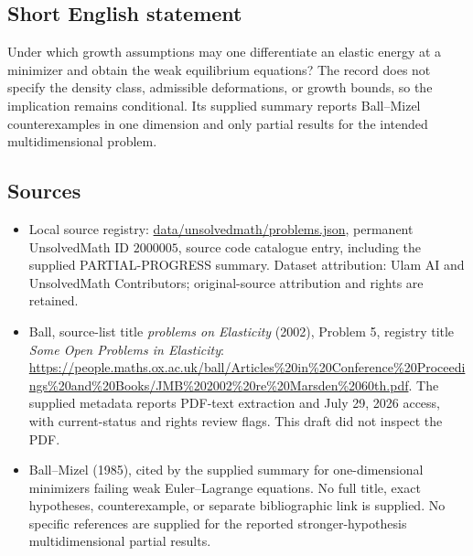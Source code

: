 \documentclass[11pt]{article}
\begin{document}
\subsection{Short English statement}
Under which growth assumptions may one differentiate an elastic energy at a minimizer and obtain the weak equilibrium equations? The record does not specify the density class, admissible deformations, or growth bounds, so the implication remains conditional. Its supplied summary reports Ball--Mizel counterexamples in one dimension and only partial results for the intended multidimensional problem.
\subsection{Sources}
\begin{itemize}
\item Local source registry: \url{data/unsolvedmath/problems.json}, permanent UnsolvedMath ID $2000005$, source code catalogue entry, including the supplied PARTIAL-PROGRESS summary. Dataset attribution: Ulam AI and UnsolvedMath Contributors; original-source attribution and rights are retained.
\item Ball, source-list title \emph{problems on Elasticity} (2002), Problem 5, registry title \emph{Some Open Problems in Elasticity}: \url{https://people.maths.ox.ac.uk/ball/Articles%20in%20Conference%20Proceedings%20and%20Books/JMB%202002%20re%20Marsden%2060th.pdf}. The supplied metadata reports PDF-text extraction and July 29, 2026 access, with current-status and rights review flags. This draft did not inspect the PDF.
\item Ball--Mizel (1985), cited by the supplied summary for one-dimensional minimizers failing weak Euler--Lagrange equations. No full title, exact hypotheses, counterexample, or separate bibliographic link is supplied. No specific references are supplied for the reported stronger-hypothesis multidimensional partial results.
\end{itemize}
\end{document}

